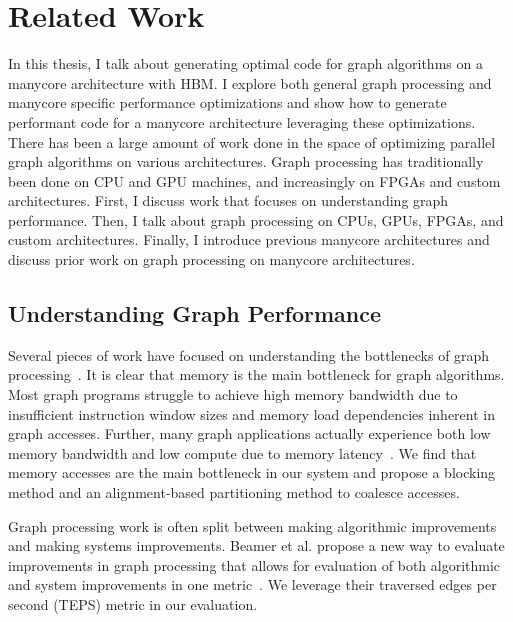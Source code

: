 \chapter{Related Work}\label{gen:sec:relatedwork}


In this thesis, I talk about generating optimal code for graph algorithms on a manycore architecture with HBM. 
I explore both general graph processing and manycore specific performance optimizations and show how to generate performant code for a manycore architecture leveraging these optimizations. 
There has been a large amount of work done in the space of optimizing parallel graph algorithms on various architectures.
Graph processing has traditionally been done on CPU and GPU machines, and increasingly on FPGAs and custom architectures. 
First, I discuss work that focuses on understanding graph performance.
Then, I talk about graph processing on CPUs, GPUs, FPGAs, and custom architectures.
Finally, I introduce previous manycore architectures and discuss prior work on graph processing on manycore architectures.

\section{Understanding Graph Performance} Several pieces of work have focused on understanding the bottlenecks of graph processing~\citep{beamer2015locality, basak2019analysis}. It is clear that memory is the main bottleneck for graph algorithms. Most graph programs struggle to achieve high memory bandwidth due to insufficient instruction window sizes and memory load dependencies inherent in graph accesses. Further, many graph applications actually experience both low memory bandwidth and low compute due to memory latency~\cite{beamer2015locality}.
We find that memory accesses are the main bottleneck in our system and propose a blocking method and an alignment-based partitioning method to coalesce accesses.

Graph processing work is often split between making algorithmic improvements and making systems improvements. 
Beamer et al. propose a new way to evaluate improvements in graph processing that allows for evaluation of both algorithmic and system improvements in one metric~\citep{beamer2015gail}.
We leverage their traversed edges per second (TEPS) metric in our evaluation.


